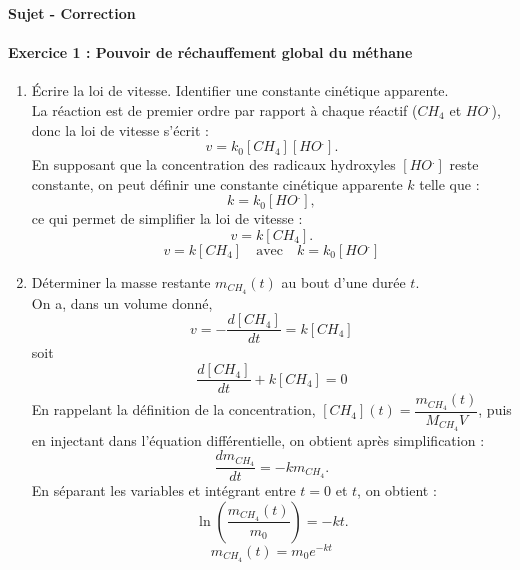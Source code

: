 \documentclass[a4paper,10pt,notitlepage,oneside]{article}
\theoremstyle{plain}
\begin{document}
\begin{center}
    {\color{BlueViolet} \Large \textbf{\color{BlueViolet}Sujet  - Correction}}
\end{center}

\paragraph{\color{BlueViolet} Exercice 1 : Pouvoir de réchauffement global du méthane}

\begin{enumerate}
    \item Écrire la loi de vitesse. Identifier une constante cinétique apparente.\\
    La réaction est de premier ordre par rapport à chaque réactif ($CH_4$ et $HO^.$), donc la loi de vitesse s'écrit :
    \[
    v = k_0 [CH_4] [HO^.].
    \]
    En supposant que la concentration des radicaux hydroxyles \([HO^.]\) reste constante, on peut définir une constante cinétique apparente \(k\) telle que :
    \[
    k = k_0 [HO^.],
    \]
    ce qui permet de simplifier la loi de vitesse :
    \[
    v = k [CH_4].
    \]
    \begin{equation*}
        \boxed{v = k [CH_4] \quad \text{avec} \quad k = k_0 [HO^.]}
    \end{equation*}

    \item Déterminer la masse restante \(m_{CH_4}(t)\) au bout d’une durée \(t\).\\
    On a, dans un volume donné,
    \begin{equation*}
        v = -\dfrac{d\left[ CH_4 \right]}{dt} = k\left[ CH_4 \right]
    \end{equation*}
    soit
    \begin{equation*}
        \dfrac{d\left[ CH_4 \right]}{dt} + k\left[ CH_4 \right] = 0
    \end{equation*}
    En rappelant la définition de la concentration, $\left[ CH_4 \right](t) = \dfrac{m_{CH_4}(t)}{M_{CH_4}V}$, puis en injectant dans l'équation différentielle, on obtient après simplification :
    \[
    \dfrac{dm_{CH_4}}{dt} = -k m_{CH_4}.
    \]
    En séparant les variables et intégrant entre \(t = 0\) et \(t\), on obtient :
    \[
    \ln \left( \dfrac{m_{CH_4}(t)}{m_0} \right) = -kt.
    \]
    \begin{equation*}
        \boxed{m_{CH_4}(t) = m_0 e^{-kt}}
    \end{equation*}


\end{enumerate}
\end{document}
